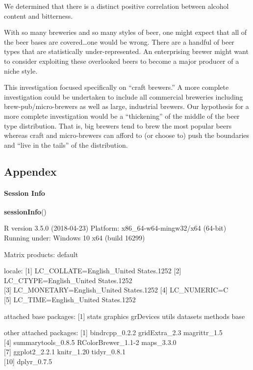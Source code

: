 \documentclass[]{article}
\newenvironment{Shaded}{\begin{snugshade}}{\end{snugshade}}
\newcommand{\KeywordTok}[1]{\textcolor[rgb]{0.13,0.29,0.53}{\textbf{#1}}}
\newcommand{\NormalTok}[1]{#1}
\let\oldparagraph\paragraph
\renewcommand{\paragraph}[1]{\oldparagraph{#1}\mbox{}}
\begin{document}
We determined that there is a distinct positive correlation between
alcohol content and bitterness.

With so many breweries and so many styles of beer, one might expect that
all of the beer bases are covered\ldots{}one would be wrong. There are a
handful of beer types that are statistically under-represented. An
enterprising brewer might want to consider exploiting these overlooked
beers to become a major producer of a niche style.

This investigation focused specifically on ``craft brewers.'' A more
complete investigation could be undertaken to include all commercial
breweries including brew-pub/micro-brewers as well as large, industrial
brewers. Our hypothesis for a more complete investigation would be a
``thickening'' of the middle of the beer type distribution. That is, big
brewers tend to brew the most popular beers whereas craft and
micro-brewers can afford to (or choose to) push the boundaries and
``live in the tails'' of the distribution.

\subsection{Appendex}\label{appendex}

\paragraph{Session Info}\label{session-info}

\begin{Shaded}
\begin{Highlighting}[]
\KeywordTok{sessionInfo}\NormalTok{()}
\end{Highlighting}
\end{Shaded}

R version 3.5.0 (2018-04-23) Platform: x86\_64-w64-mingw32/x64 (64-bit)
Running under: Windows 10 x64 (build 16299)

Matrix products: default

locale: {[}1{]} LC\_COLLATE=English\_United States.1252 {[}2{]}
LC\_CTYPE=English\_United States.1252\\
{[}3{]} LC\_MONETARY=English\_United States.1252 {[}4{]} LC\_NUMERIC=C\\
{[}5{]} LC\_TIME=English\_United States.1252

attached base packages: {[}1{]} stats graphics grDevices utils datasets
methods base

other attached packages: {[}1{]} bindrcpp\_0.2.2 gridExtra\_2.3
magrittr\_1.5\\
{[}4{]} summarytools\_0.8.5 RColorBrewer\_1.1-2 maps\_3.3.0\\
{[}7{]} ggplot2\_2.2.1 knitr\_1.20 tidyr\_0.8.1\\
{[}10{]} dplyr\_0.7.5
\end{document}
